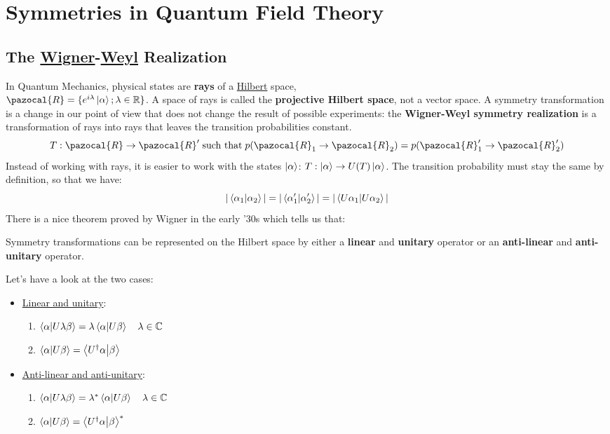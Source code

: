 \documentclass[../main.tex]{subfiles}
\begin{document}
\setchapterpreamble[u]{\margintoc}
\chapter[Symmetries in Quantum Field Theory]{Symmetries in Quantum Field Theory\footnotemark[0]}
\section{The \href{https://en.wikipedia.org/wiki/Eugene_Wigner}{Wigner}-\href{https://en.wikipedia.org/wiki/Hermann_Weyl}{Weyl} Realization}
In Quantum Mechanics, physical states are \textbf{rays} of a \href{https://en.wikipedia.org/wiki/David_Hilbert}{Hilbert} space,\\
$\pazocal{R}=\{e^{i\lambda}\ket{\alpha};\lambda\in\mathbb{R}\}$. A space of rays is called the \textbf{projective Hilbert space}, not a vector space. A symmetry transformation is a change in our point of view that does not change the result of possible experiments: the \textbf{Wigner-Weyl symmetry realization} is a transformation of rays into rays that leaves the transition probabilities constant.
\[
T:\pazocal{R}\to\pazocal{R}' \;\text{such that}\;p(\pazocal{R}_1\to\pazocal{R}_2)=p(\pazocal{R}'_1\to\pazocal{R}'_2)
\]
Instead of working with rays, it is easier to work with the states $\ket{\alpha}$: $T:\ket{\alpha}\to U(T)\ket{\alpha}$. The transition probability must stay the same by definition, so that we have:
\[
|\braket{\alpha_1}{\alpha_2}|=|\braket{\alpha'_1}{\alpha'_2}|=|\braket{U\alpha_1}{U\alpha_2}| 
\]
There is a nice theorem proved by Wigner in the early '30s which tells us that:
\begin{theorem}[Wigner]
Symmetry transformations can be represented on the Hilbert space by either a \textbf{linear} and \textbf{unitary} operator or an \textbf{anti-linear} and \textbf{anti-unitary} operator.
\end{theorem}
Let's have a look at the two cases:
\begin{itemize}
    \item \underline{Linear and unitary}:
    \begin{enumerate}
        \item $\braket{\alpha}{U\lambda\beta}=\lambda\braket{\alpha}{U\beta}\quad\lambda\in\mathbb{C}$
        \item $\braket{\alpha}{U\beta}=\braket{U^\dagger\alpha}{\beta}$
    \end{enumerate}
    \item \underline{Anti-linear and anti-unitary}:
    \begin{enumerate}
        \item $\braket{\alpha}{U\lambda\beta}=\lambda^*\braket{\alpha}{U\beta}\quad\lambda\in\mathbb{C}$
        \item $\braket{\alpha}{U\beta}=\braket{U^\dagger\alpha}{\beta}^*$
    \end{enumerate}
\end{itemize}
\end{document}
